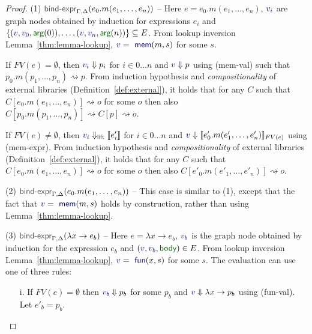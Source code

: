 \documentclass[acmsmall,anonymous,fleqn]{acmart}\settopmatter{printfolios=false,printccs=false,printacmref=false}
\theoremstyle{plain}
\theoremstyle{definition}
\newcommand{\ident}[1]{\textnormal{\textcolor{idclr}{\sffamily #1}}}
\newcommand{\bndclr}[1]{\textcolor{kvdclr}{#1}}
\newcommand{\bnd}[1]{\textnormal{\textcolor{kvdclr}{\sffamily #1}}}
\newcommand{\blbl}[1]{\textnormal{\textcolor{numclr}{\sffamily #1}}}
\newcommand{\rname}[1]{{\sffamily\small(#1)}}
\begin{document}
\begin{proof}
\vspace{0.75em}\noindent(1) $\ident{bind-expr}_{\Gamma, \Delta}(e_0.m(e_1, \ldots, e_n))$ --
  Here $e = e_0.m(e_1, \ldots, e_n)$, $\bndclr{v_i}$ are graph nodes obtained by induction for
  expressions $e_i$ and $\{ (\bndclr{v}, \bndclr{v_0}, \blbl{arg}(0)), \ldots, (\bndclr{v}, \bndclr{v_n}, \blbl{arg}(n))\} \subseteq E$.
  From lookup inversion Lemma~\ref{thm:lemma-lookup}, $\bndclr{v} = \bnd{mem}(m, s)$ for some $s$.

  If $FV(e)=\emptyset$, then $\bndclr{v_i} \Downarrow p_i$ for $i\in 0\ldots n$ and
  $\bndclr{v}\Downarrow p$ using \rname{mem-val} such that $p_0.m(p_1, \ldots, p_n) \rightsquigarrow p$.
  From induction hypothesis and \emph{compositionality} of external libraries (Definition~\ref{def:external}),
  it holds that for any $C$ such that $C[e_0.m(e_1, \ldots, e_n)] \rightsquigarrow o$ for some $o$
  then also $C[p_0.m(p_1, \ldots, p_n)] \rightsquigarrow C[p] \rightsquigarrow o$.

  If $FV(e)\neq\emptyset$, then $\bndclr{v_i} \Downarrow_\ident{lift} \llbracket e'_i \rrbracket$ for $i\in 0\ldots n$ and
  $\bndclr{v}\Downarrow \llbracket e'_0.m(e'_1, \ldots, e'_n) \rrbracket_{FV(e)}$ using \rname{mem-expr}.
  From induction hypothesis and \emph{compositionality} of external libraries (Definition~\ref{def:external}),
  it holds that for any $C$ such that $C[e_0.m(e_1, \ldots, e_n)] \rightsquigarrow o$ for some $o$
  then also $C[e'_0.m(e'_1, \ldots, e'_n)] \rightsquigarrow o$.

\vspace{0.75em}\noindent(2) $\ident{bind-expr}_{\Gamma, \Delta}(e_0.m(e_1, \ldots, e_n))$ --
  This case is similar to (1), except that the fact that $\bndclr{v} = \bnd{mem}(m, s)$
  holds by construction, rather than using Lemma~\ref{thm:lemma-lookup}.

\vspace{0.75em}\noindent(3) $\ident{bind-expr}_{\Gamma, \Delta}(\lambda x\rightarrow e_b)$ --
  Here $e = \lambda x\rightarrow e_b$, $\bndclr{v_b}$ is the graph node obtained by induction
  for the expression $e_b$ and $(\bndclr{v}, \bndclr{v_b}, \blbl{body}) \in E$.
  From lookup inversion Lemma~\ref{thm:lemma-lookup}, $\bndclr{v} = \bnd{fun}(x, s)$ for some $s$.
  The evaluation can use one of three rules:

  \begin{enumerate}
  \item[i.]
  If $FV(e)=\emptyset$ then $\bndclr{v_b}\Downarrow p_b$ for some $p_b$ and $\bndclr{v}\Downarrow \lambda x\rightarrow p_b$
  using \rname{fun-val}. Let $e'_b=p_b$.


\end{enumerate}
\end{proof}
\end{document}
